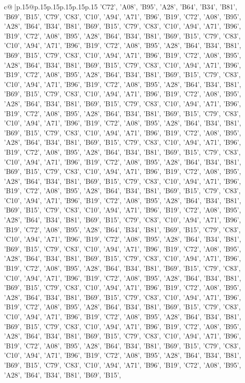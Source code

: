 \documentclass{article}
\begin{document}
{\begin{supertabular}{c@{$\;$}|p{.15\linewidth}@{}p{.15\linewidth}p{.15\linewidth}p{.15\linewidth}p{.15\linewidth}p{.15\linewidth}}
{{{'C72', 'A08', 'B95', 'A28', 'B64', 'B34', 'B81', 'B69', 'B15', 'C79', 'C83', 'C10', 'A94', 'A71', 'B96', 'B19', 'C72', 'A08', 'B95', 'A28', 'B64', 'B34', 'B81', 'B69', 'B15', 'C79', 'C83', 'C10', 'A94', 'A71', 'B96', 'B19', 'C72', 'A08', 'B95', 'A28', 'B64', 'B34', 'B81', 'B69', 'B15', 'C79', 'C83', 'C10', 'A94', 'A71', 'B96', 'B19', 'C72', 'A08', 'B95', 'A28', 'B64', 'B34', 'B81', 'B69', 'B15', 'C79', 'C83', 'C10', 'A94', 'A71', 'B96', 'B19', 'C72', 'A08', 'B95', 'A28', 'B64', 'B34', 'B81', 'B69', 'B15', 'C79', 'C83', 'C10', 'A94', 'A71', 'B96', 'B19', 'C72', 'A08', 'B95', 'A28', 'B64', 'B34', 'B81', 'B69', 'B15', 'C79', 'C83', 'C10', 'A94', 'A71', 'B96', 'B19', 'C72', 'A08', 'B95', 'A28', 'B64', 'B34', 'B81', 'B69', 'B15', 'C79', 'C83', 'C10', 'A94', 'A71', 'B96', 'B19', 'C72', 'A08', 'B95', 'A28', 'B64', 'B34', 'B81', 'B69', 'B15', 'C79', 'C83', 'C10', 'A94', 'A71', 'B96', 'B19', 'C72', 'A08', 'B95', 'A28', 'B64', 'B34', 'B81', 'B69', 'B15', 'C79', 'C83', 'C10', 'A94', 'A71', 'B96', 'B19', 'C72', 'A08', 'B95', 'A28', 'B64', 'B34', 'B81', 'B69', 'B15', 'C79', 'C83', 'C10', 'A94', 'A71', 'B96', 'B19', 'C72', 'A08', 'B95', 'A28', 'B64', 'B34', 'B81', 'B69', 'B15', 'C79', 'C83', 'C10', 'A94', 'A71', 'B96', 'B19', 'C72', 'A08', 'B95', 'A28', 'B64', 'B34', 'B81', 'B69', 'B15', 'C79', 'C83', 'C10', 'A94', 'A71', 'B96', 'B19', 'C72', 'A08', 'B95', 'A28', 'B64', 'B34', 'B81', 'B69', 'B15', 'C79', 'C83', 'C10', 'A94', 'A71', 'B96', 'B19', 'C72', 'A08', 'B95', 'A28', 'B64', 'B34', 'B81', 'B69', 'B15', 'C79', 'C83', 'C10', 'A94', 'A71', 'B96', 'B19', 'C72', 'A08', 'B95', 'A28', 'B64', 'B34', 'B81', 'B69', 'B15', 'C79', 'C83', 'C10', 'A94', 'A71', 'B96', 'B19', 'C72', 'A08', 'B95', 'A28', 'B64', 'B34', 'B81', 'B69', 'B15', 'C79', 'C83', 'C10', 'A94', 'A71', 'B96', 'B19', 'C72', 'A08', 'B95', 'A28', 'B64', 'B34', 'B81', 'B69', 'B15', 'C79', 'C83', 'C10', 'A94', 'A71', 'B96', 'B19', 'C72', 'A08', 'B95', 'A28', 'B64', 'B34', 'B81', 'B69', 'B15', 'C79', 'C83', 'C10', 'A94', 'A71', 'B96', 'B19', 'C72', 'A08', 'B95', 'A28', 'B64', 'B34', 'B81', 'B69', 'B15', 'C79', 'C83', 'C10', 'A94', 'A71', 'B96', 'B19', 'C72', 'A08', 'B95', 'A28', 'B64', 'B34', 'B81', 'B69', 'B15', 'C79', 'C83', 'C10', 'A94', 'A71', 'B96', 'B19', 'C72', 'A08', 'B95', 'A28', 'B64', 'B34', 'B81', 'B69', 'B15', 'C79', 'C83', 'C10', 'A94', 'A71', 'B96', 'B19', 'C72', 'A08', 'B95', 'A28', 'B64', 'B34', 'B81', 'B69', 'B15', 'C79', 'C83', 'C10', 'A94', 'A71', 'B96', 'B19', 'C72', 'A08', 'B95', 'A28', 'B64', 'B34', 'B81', 'B69', 'B15', 'C79', 'C83', 'C10', 'A94', 'A71', 'B96', 'B19', 'C72', 'A08', 'B95', 'A28', 'B64', 'B34', 'B81', 'B69', 'B15', 'C79', 'C83', 'C10', 'A94', 'A71', 'B96', 'B19', 'C72', 'A08', 'B95', 'A28', 'B64', 'B34', 'B81', 'B69', 'B15', 'C79', 'C83', 'C10', 'A94', 'A71', 'B96', 'B19', 'C72', 'A08', 'B95', 'A28', 'B64', 'B34', 'B81', 'B69', 'B15', 'C79', 'C83', 'C10', 'A94', 'A71', 'B96', 'B19', 'C72', 'A08', 'B95', 'A28', 'B64', 'B34', 'B81', 'B69', 'B15', 'C79', 'C83', 'C10', 'A94', 'A71', 'B96', 'B19', 'C72', 'A08', 'B95', 'A28', 'B64', 'B34', 'B81', 'B69', 'B15', 'C79', 'C83', 'C10', 'A94', 'A71', 'B96', 'B19', 'C72', 'A08', 'B95', 'A28', 'B64', 'B34', 'B81', 'B69', 'B15', }}}
\end{supertabular}}
\end{document}
